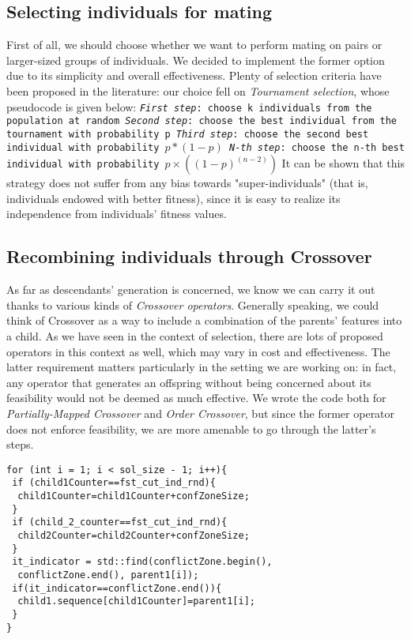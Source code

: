 \documentclass[letterpaper, 10 pt, conference]{ieeeconf}  %
\begin{document}
\subsection{Selecting individuals for mating}
First of all, we should choose whether we want to perform mating on pairs
or larger-sized groups of individuals. We decided to implement the former option due to its simplicity and overall effectiveness. \newline
Plenty of selection criteria have been proposed in the literature: our choice fell on \textit{Tournament selection}, whose pseudocode is given below: \newline\newline
\texttt{\textit{First step}: choose k individuals from the population at random
\newline \textit{Second step}: choose the best individual from the 
tournament with probability p
\newline \textit{Third step}: choose the second best individual 
with probability $p*(1-p)$
\newline \textit{N-th step}: choose the n-th best individual 
with probability $p\times((1-p)^(n-2))$}
\newline\newline
It can be shown that this strategy does not suffer from any bias towards "super-individuals" (that is, individuals endowed with better fitness), since it is easy to realize its independence from individuals' fitness values.


\subsection{Recombining individuals through Crossover}
As far as descendants' generation is concerned, we know we can carry it out thanks to various kinds of \textit{Crossover operators}. Generally speaking, we
could think of Crossover as a way to include a combination of the parents' features into a child. As we have seen in the context of selection, there are lots of proposed operators in this context as well, which may vary in cost and
effectiveness. The latter requirement matters particularly in the setting we are working on: in fact, any operator that generates an offspring without being concerned about its feasibility would not be deemed as much effective.
We wrote the code both for \textit{Partially-Mapped Crossover} and \textit{Order Crossover}, but since the former operator does not enforce feasibility, we are more amenable to go through the latter's steps.
\begin{lstlisting}[caption={Order Crossover, in \texttt{TSPCrossover.cpp}}]
for (int i = 1; i < sol_size - 1; i++){
 if (child1Counter==fst_cut_ind_rnd){
  child1Counter=child1Counter+confZoneSize;
 }
 if (child_2_counter==fst_cut_ind_rnd){
  child2Counter=child2Counter+confZoneSize;
 }
 it_indicator = std::find(conflictZone.begin(),
  conflictZone.end(), parent1[i]);
 if(it_indicator==conflictZone.end()){
  child1.sequence[child1Counter]=parent1[i]; 		                            
 }
}		
\end{lstlisting}
\end{document}
